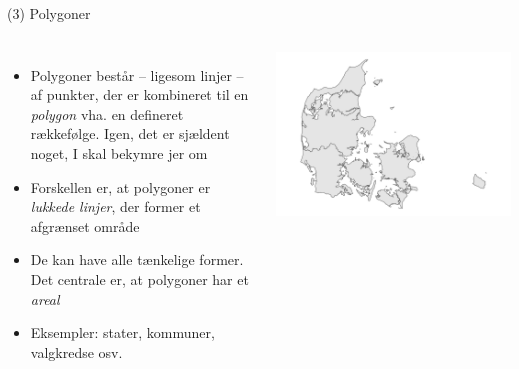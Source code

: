 \documentclass[
  8pt,
  ignorenonframetext,
  aspectratio=169]{beamer}
\newcommand{\columnsbegin}{\begin{columns}}
\newcommand{\columnsend}{\end{columns}}
\begin{document}
\begin{frame}{(3) Polygoner}
\protect\hypertarget{polygoner}{}
\columnsbegin
{}

\begin{itemize}
\item
  Polygoner består -- ligesom linjer -- af punkter, der er kombineret
  til en \emph{polygon} vha. en defineret rækkefølge. Igen, det er
  sjældent noget, I skal bekymre jer om
\item
  Forskellen er, at polygoner er \emph{lukkede linjer}, der former et
  afgrænset område
\item
  De kan have alle tænkelige former. Det centrale er, at polygoner har
  et \emph{areal}
\item
  Eksempler: stater, kommuner, valgkredse osv.
\end{itemize}


\tiny

\includegraphics[width=1\linewidth]{crashcourse_slides_files/figure-beamer/unnamed-chunk-4-1}

\normalsize

\columnsend
\end{frame}
\end{document}
